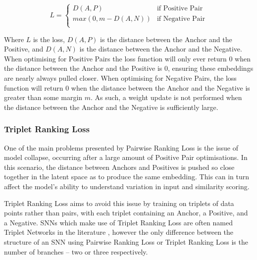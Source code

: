 \begin{equation}
	\label{eq:pairwiseLoss}
	L =
		\begin{cases}
			D(A, P) & \text{if Positive Pair}\\
			max(0, m - D(A, N)) & \text{if Negative Pair}\\
		\end{cases}       
\end{equation}

\noindent Where $L$ is the loss, $D(A, P)$ is the distance between the Anchor and the Positive, and $D(A, N)$ is the distance between the Anchor and the Negative. When optimising for Positive Pairs the loss function will only ever return 0 when the distance between the Anchor and the Positive is 0, ensuring these embeddings are nearly always pulled closer. When optimising for Negative Pairs, the loss function will return 0 when the distance between the Anchor and the Negative is greater than some margin $m$. As such, a weight update is not performed when the distance between the Anchor and the Negative is sufficiently large.

\subsubsection{Triplet Ranking Loss}\label{ch:ID,sec:SNNBackground,sub:lossFunction,subsub:Triplet}

One of the main problems presented by Pairwise Ranking Loss is the issue of model collapse, occurring after a large amount of Positive Pair optimisations. In this scenario, the distance between Anchors and Positives is pushed so close together in the latent space as to produce the same embedding. This can in turn affect the model's ability to understand variation in input and similarity scoring. 

Triplet Ranking Loss aims to avoid this issue by training on triplets of data points rather than pairs, with each triplet containing an Anchor, a Positive, and a Negative. SNNs which make use of Triplet Ranking Loss are often named Triplet Networks in the literature \cite{hoffer_deep_2018}, however the only difference between the structure of an SNN using Pairwise Ranking Loss or Triplet Ranking Loss is the number of branches -- two or three respectively. 

